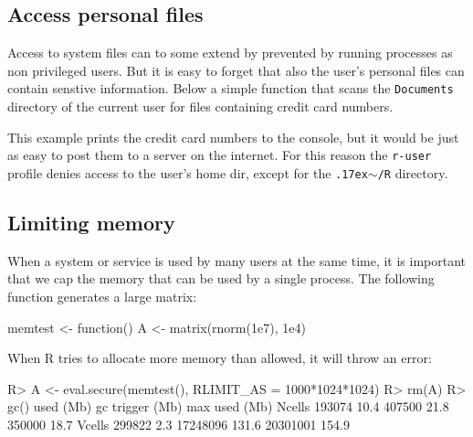 \documentclass{jss}
\newcommand{\R}{\textsf{R}\xspace}
\begin{document}
\begin{appendices}
\subsection{Access personal files}
\label{creditcard}

Access to system files can to some extend by prevented by running processes as
non privileged users. But it is easy to forget that also the user's personal
files can contain senstive information. Below a simple function that scans the
\texttt{Documents} directory of the current user for files containing credit
card numbers.

\begin{CodeChunk}
\end{CodeChunk}

This example prints the credit card numbers to the console, but it would be
just as easy to post them to a server on the internet. For this reason the
\texttt{r-user} profile denies access to the user's home dir, except for the
\texttt{{\raise.17ex\hbox{$\scriptstyle\sim$}}/R} directory.


\subsection{Limiting memory}

When a system or service is used by many users at the same time, it is
important that we cap the memory that can be used by a single process. The
following function generates a large matrix:

\begin{CodeChunk}
\begin{CodeInput}
memtest <- function(){
	A <- matrix(rnorm(1e7), 1e4)
}
\end{CodeInput}
\end{CodeChunk}

When \R tries to allocate more memory than allowed, it will throw an error:

\begin{CodeChunk}
\begin{CodeInput}
R> A <- eval.secure(memtest(), RLIMIT_AS = 1000*1024*1024)
R> rm(A)
R> gc()
         used (Mb) gc trigger  (Mb) max used  (Mb)
Ncells 193074 10.4     407500  21.8   350000  18.7
Vcells 299822  2.3   17248096 131.6 20301001 154.9


\end{CodeInput}
\end{CodeChunk}
\end{appendices}
\end{document}
